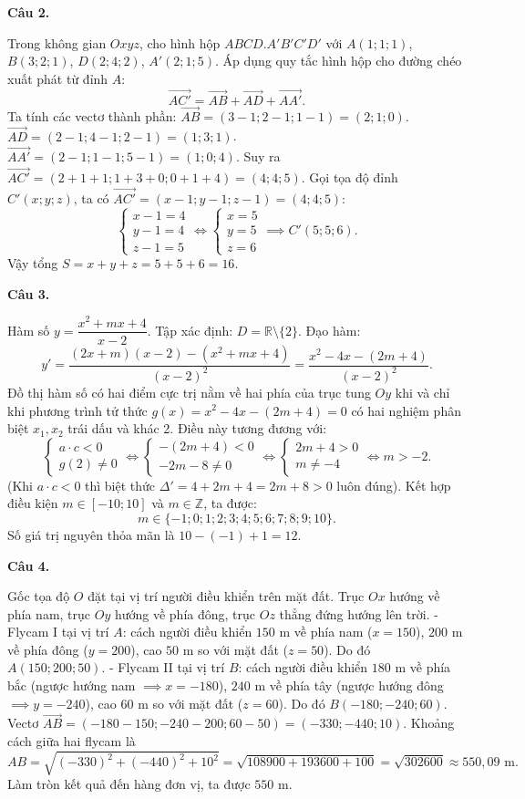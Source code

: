 \documentclass[12pt,a4paper]{article}
\newcommand{\loigiai}[1]{\par\medskip\Needspace{4\baselineskip}\noindent\textbf{#1}\par\nobreak}
\begin{document}
\loigiai{Câu 2.}
Trong không gian $Oxyz$, cho hình hộp $ABCD.A'B'C'D'$ với $A(1;1;1)$, $B(3;2;1)$, $D(2;4;2)$, $A'(2;1;5)$.
Áp dụng quy tắc hình hộp cho đường chéo xuất phát từ đỉnh $A$:
$$\vec{AC'} = \vec{AB} + \vec{AD} + \vec{AA'}.$$
Ta tính các vectơ thành phần:
$\vec{AB} = (3-1; 2-1; 1-1) = (2; 1; 0)$.
$\vec{AD} = (2-1; 4-1; 2-1) = (1; 3; 1)$.
$\vec{AA'} = (2-1; 1-1; 5-1) = (1; 0; 4)$.
Suy ra $\vec{AC'} = (2+1+1; 1+3+0; 0+1+4) = (4; 4; 5)$.
Gọi tọa độ đỉnh $C'(x;y;z)$, ta có $\vec{AC'}=(x-1; y-1; z-1)=(4; 4; 5)$:
$$\begin{cases} x-1=4\\ y-1=4\\ z-1=5 \end{cases} \iff \begin{cases} x=5\\ y=5\\ z=6 \end{cases} \implies C'(5;5;6).$$
Vậy tổng $S=x+y+z=5+5+6=16$.

\loigiai{Câu 3.}
Hàm số $y=\dfrac{x^2+mx+4}{x-2}$.
Tập xác định: $D=\mathbb{R}\setminus\{2\}$.
Đạo hàm:
$$y'=\dfrac{(2x+m)(x-2)-(x^2+mx+4)}{(x-2)^2} = \dfrac{x^2-4x-(2m+4)}{(x-2)^2}.$$
Đồ thị hàm số có hai điểm cực trị nằm về hai phía của trục tung $Oy$ khi và chỉ khi phương trình tử thức $g(x)=x^2-4x-(2m+4)=0$ có hai nghiệm phân biệt $x_1, x_2$ trái dấu và khác 2.
Điều này tương đương với:
$$\begin{cases}
a\cdot c < 0\\
g(2)\ne 0
\end{cases} \iff \begin{cases}
-(2m+4) < 0\\
-2m-8 \ne 0
\end{cases} \iff \begin{cases}
2m+4 > 0\\
m \ne -4
\end{cases} \iff m > -2.$$
(Khi $a\cdot c < 0$ thì biệt thức $\Delta'=4+2m+4=2m+8>0$ luôn đúng).
Kết hợp điều kiện $m\in[-10;10]$ và $m\in\mathbb{Z}$, ta được:
$$m \in \{-1; 0; 1; 2; 3; 4; 5; 6; 7; 8; 9; 10\}.$$
Số giá trị nguyên thỏa mãn là $10 - (-1) + 1 = 12$.

\loigiai{Câu 4.}
Gốc tọa độ $O$ đặt tại vị trí người điều khiển trên mặt đất.
Trục $Ox$ hướng về phía nam, trục $Oy$ hướng về phía đông, trục $Oz$ thẳng đứng hướng lên trời.
- Flycam I tại vị trí $A$: cách người điều khiển $150\text{ m}$ về phía nam ($x=150$), $200\text{ m}$ về phía đông ($y=200$), cao $50\text{ m}$ so với mặt đất ($z=50$).
Do đó $A(150; 200; 50)$.
- Flycam II tại vị trí $B$: cách người điều khiển $180\text{ m}$ về phía bắc (ngược hướng nam $\implies x=-180$), $240\text{ m}$ về phía tây (ngược hướng đông $\implies y=-240$), cao $60\text{ m}$ so với mặt đất ($z=60$).
Do đó $B(-180; -240; 60)$.
Vectơ $\vec{AB} = (-180-150; -240-200; 60-50) = (-330; -440; 10)$.
Khoảng cách giữa hai flycam là
$$AB = \sqrt{(-330)^2 + (-440)^2 + 10^2} = \sqrt{108900 + 193600 + 100} = \sqrt{302600} \approx 550{,}09\text{ m}.$$
Làm tròn kết quả đến hàng đơn vị, ta được $550\text{ m}$.
\end{document}
